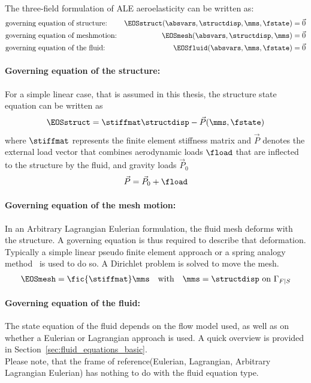 \documentclass[../main.tex]{subfiles}
\begin{document}
 \\
The three-field formulation of \ac{ALE} aeroelasticity can be written as:
\begin{align}
&\text{governing equation of structure:}  &\EOSstruct (\absvars,\structdisp,\mms,\fstate) = \vec{0} \label{eq:3field_structure}\\
&\text{governing equation of meshmotion:} &\EOSmesh   (\absvars,\structdisp,\mms)         = \vec{0} \label{eq:3field_mesh}\\
&\text{governing equation of the fluid:}  &\EOSfluid  (\absvars,\mms,\fstate)             = \vec{0}
\label{eq:3field_fluid}\\
\end{align}

\paragraph{Governing equation of the structure:}
For a simple linear case, that is assumed in this thesis, the structure state equation can be written as
\begin{align}\label{eq:eos_struct}
\EOSstruct = \stiffmat \structdisp - \vec{P}(\mms,\fstate)
\end{align}
where $\stiffmat$ represents the finite element stiffness matrix and $\vec{P}$ denotes the external load vector that combines aerodynamic loads $\fload$ that are inflected to the structure by the fluid, and gravity loads $\vec{P}_0$
\begin{align}
\vec{P}=\vec{P}_0 + \fload
\end{align}

\paragraph{Governing equation of the mesh motion:}
In an Arbitrary Lagrangian Eulerian formulation, the fluid mesh deforms with the structure. A governing equation is thus required to describe that deformation. Typically a simple linear pseudo finite element approach or a spring analogy method~\cite{Farhat1998} is used to do so. A Dirichlet problem is solved to move the mesh.
\begin{align}\label{eq:eos_mesh}
\EOSmesh = \fic{\stiffmat} \mms~~~\text{with}~~~\mms=\structdisp~\text{on}~\Gamma_{F|S}
\end{align}

\paragraph{Governing equation of the fluid:}
The state equation of the fluid depends on the flow model used, as well as on whether a Eulerian or Lagrangian approach is used. A quick overview is provided in Section~\ref{sec:fluid_equations_basic}.\\
Please note, that the frame of reference(Eulerian, Lagrangian, Arbitrary Lagrangian Eulerian) has nothing to do with the fluid equation type.
\end{document}
